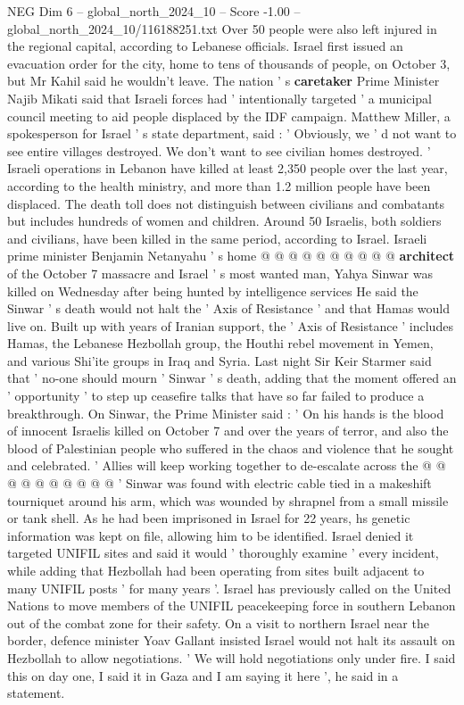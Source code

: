 \begin{textsample}{NEG Dim 6 – global\_north\_2024\_10 – Score -1.00 – global\_north\_2024\_10/116188251.txt}  \label{ex:f6_neg_054}
Over 50 people were also left injured in the regional capital, according to Lebanese officials.
Israel first issued an evacuation order for the city, home to tens of thousands of people, on October 3, but Mr Kahil said he wouldn't leave.
The nation ' s \textbf{caretaker} Prime Minister Najib Mikati said that Israeli forces had ' intentionally targeted ' a municipal council meeting to aid people displaced by the IDF campaign.
Matthew Miller, a spokesperson for Israel ' s state department, said : ' Obviously, we ' d not want to see entire villages destroyed.
We don't want to see civilian homes destroyed. ' Israeli operations in Lebanon have killed at least 2,350 people over the last year, according to the health ministry, and more than 1.2 million people have been displaced.
The death toll does not distinguish between civilians and combatants but includes hundreds of women and children.
Around 50 Israelis, both soldiers and civilians, have been killed in the same period, according to Israel.
Israeli prime minister Benjamin Netanyahu ' s home @ @ @ @ @ @ @ @ @ @ \textbf{architect} of the October 7 massacre and Israel ' s most wanted man, Yahya Sinwar was killed on Wednesday after being hunted by intelligence services He said the Sinwar ' s death would not halt the ' Axis of Resistance ' and that Hamas would live on.
Built up with years of Iranian support, the ' Axis of Resistance ' includes Hamas, the Lebanese Hezbollah group, the Houthi rebel movement in Yemen, and various Shi'ite groups in Iraq and Syria.
Last night Sir Keir Starmer said that ' no-one should mourn ' Sinwar ' s death, adding that the moment offered an ' opportunity ' to step up ceasefire talks that have so far failed to produce a breakthrough.
On Sinwar, the Prime Minister said : ' On his hands is the blood of innocent Israelis killed on October 7 and over the years of terror, and also the blood of Palestinian people who suffered in the chaos and violence that he sought and celebrated. ' Allies will keep working together to de-escalate across the @ @ @ @ @ @ @ @ @ @ ' Sinwar was found with electric cable tied in a makeshift tourniquet around his arm, which was wounded by shrapnel from a small missile or tank shell.
As he had been imprisoned in Israel for 22 years, hs genetic information was kept on file, allowing him to be identified.
Israel denied it targeted UNIFIL sites and said it would ' thoroughly examine ' every incident, while adding that Hezbollah had been operating from sites built adjacent to many UNIFIL posts ' for many years '.
Israel has previously called on the United Nations to move members of the UNIFIL peacekeeping force in southern Lebanon out of the combat zone for their safety.
On a visit to northern Israel near the border, defence minister Yoav Gallant insisted Israel would not halt its assault on Hezbollah to allow negotiations. ' We will hold negotiations only under fire.
I said this on day one, I said it in Gaza and I am saying it here ', he said in a statement.

\end{textsample}
